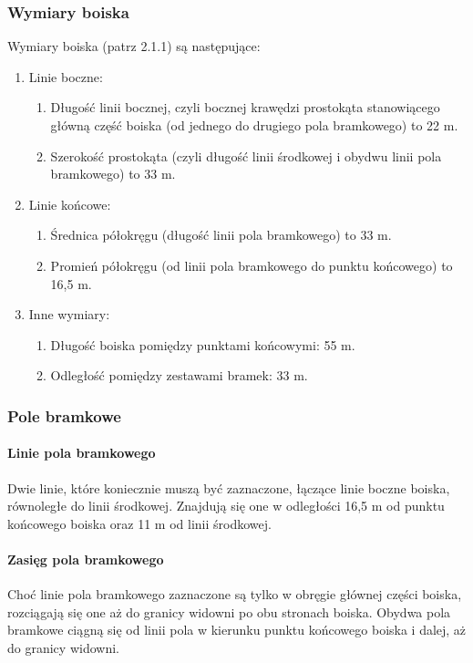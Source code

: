\documentclass[12pt]{article}
\begin{document}
\subsubsection{Wymiary boiska}
Wymiary boiska (patrz 2.1.1) są następujące:
\begin{enumerate}
	\item{Linie boczne:}
	      \begin{enumerate}
		      \item Długość linii bocznej, czyli bocznej krawędzi prostokąta stanowiącego
		            główną część boiska (od jednego do drugiego pola bramkowego) to 22 m.

		      \item Szerokość prostokąta (czyli długość linii środkowej i obydwu linii
		            pola bramkowego) to 33 m.
	      \end{enumerate}
	\item{Linie końcowe:}
	      \begin{enumerate}
		      \item Średnica półokręgu (długość linii pola bramkowego) to 33 m.

		      \item Promień półokręgu (od linii pola bramkowego do punktu końcowego) to
		            16,5 m.
	      \end{enumerate}
	\item{Inne wymiary:}
	      \begin{enumerate}
		      \item Długość boiska pomiędzy punktami końcowymi: 55 m.

		      \item Odległość pomiędzy zestawami bramek: 33 m.
	      \end{enumerate}
\end{enumerate}

\subsubsection{Pole bramkowe}
\paragraph{Linie pola bramkowego}
Dwie linie, które koniecznie
muszą być zaznaczone, łączące linie boczne boiska, równoległe do linii
środkowej. Znajdują się one w odległości 16,5 m od punktu końcowego
boiska oraz 11 m od linii środkowej.

\paragraph{Zasięg pola bramkowego}
Choć linie pola bramkowego
zaznaczone są tylko w obręgie głównej części boiska, rozciągają się one
aż do granicy widowni po obu stronach boiska. Obydwa pola bramkowe
ciągną się od linii pola w kierunku punktu końcowego boiska i dalej, aż
do granicy widowni.
\end{document}
